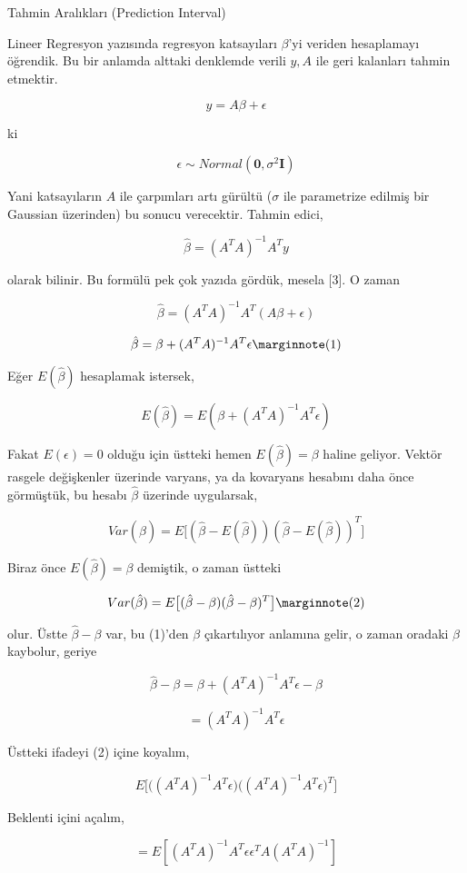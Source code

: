 \documentclass[12pt,fleqn]{article}\usepackage{../../common}
\begin{document}
Tahmin Aralıkları (Prediction Interval)

Lineer Regresyon yazısında regresyon katsayıları $\beta$'yi veriden
hesaplamayı öğrendik. Bu bir anlamda alttaki denklemde verili $y,A$ ile
geri kalanları tahmin etmektir. 

$$ y = A\beta + \epsilon  $$

ki

$$ \epsilon \sim Normal(\mathbf{0}, \sigma^2 \mathbf{I}) $$

Yani katsayıların $A$ ile çarpımları artı gürültü ($\sigma$ ile parametrize
edilmiş bir Gaussian üzerinden) bu sonucu verecektir. Tahmin edici,

$$ \hat{\beta} = (A^TA)^{-1}A^Ty $$

olarak bilinir. Bu formülü pek çok yazıda gördük, mesela [3]. O zaman

$$ \hat{\beta} = (A^TA)^{-1}A^T(A\beta + \epsilon) $$

$$ 
\hat{\beta} = \beta  + (A^TA)^{-1}A^T \epsilon 
\mlabel{1}
$$

Eğer $E( \hat{\beta} )$ hesaplamak istersek, 

$$ E( \hat{\beta} ) = E(  \beta  + (A^TA)^{-1}A^T \epsilon )$$

Fakat $E(\epsilon) = 0$ olduğu için üstteki hemen $E( \hat{\beta} ) = \beta$
haline geliyor. Vektör rasgele değişkenler üzerinde varyans, ya da kovaryans
hesabını daha önce görmüştük, bu hesabı $\hat{\beta}$ üzerinde uygularsak,

$$ Var(\hat{\beta}) = 
E \big[
(\hat{\beta} - E(\hat{\beta}))  
(\hat{\beta} - E(\hat{\beta}))^T 
\big]
$$

Biraz önce $E( \hat{\beta} ) = \beta$ demiştik, o zaman üstteki 

$$ 
Var(\hat{\beta}) = 
E \big[
(\hat{\beta} - \beta)  
(\hat{\beta} - \beta)^T 
\big]
\mlabel{2}
$$

olur. Üstte $\hat{\beta} - \beta$ var, bu (1)'den $\beta$ çıkartılıyor
anlamına gelir, o zaman oradaki $\beta$ kaybolur, geriye 

$$ \hat{\beta} - \beta = \beta  + (A^TA)^{-1}A^T \epsilon - \beta 
$$

$$ = (A^TA)^{-1}A^T \epsilon   $$

Üstteki ifadeyi (2) içine koyalım, 

$$ E \bigg[
\big( (A^TA)^{-1}A^T \epsilon \big)
\big( (A^TA)^{-1}A^T \epsilon \big)^T
\bigg]
 $$

Beklenti içini açalım, 

$$  = E [(A^TA)^{-1}A^T \epsilon \epsilon^T A (A^TA)^{-1}] $$
\end{document}
